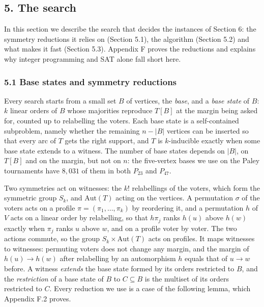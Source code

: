 \documentclass[
]{article}
\begin{document}
\subsection{5. The search}\label{the-search}

In this section we describe the search that decides the instances of
Section 6: the symmetry reductions it relies on (Section 5.1), the
algorithm (Section 5.2) and what makes it fast (Section 5.3). Appendix F
proves the reductions and explains why integer programming and SAT alone
fall short here.

\subsubsection{5.1 Base states and symmetry
reductions}\label{base-states-and-symmetry-reductions}

Every search starts from a small set \(B\) of vertices, the \emph{base},
and a \emph{base state} of \(B\): \(k\) linear orders of \(B\) whose
majorities reproduce \(T[B]\) at the margin being asked for, counted up
to relabelling the voters. Each base state is a self-contained
subproblem, namely whether the remaining \(n - |B|\) vertices can be
inserted so that every arc of \(T\) gets the right support, and \(T\) is
\(k\)-inducible exactly when some base state extends to a witness. The
number of base states depends on \(|B|\), on \(T[B]\) and on the margin,
but not on \(n\): the five-vertex bases we use on the Paley tournaments
have \(8{,}031\) of them in both \(P_{23}\) and \(P_{47}\).

Two symmetries act on witnesses: the \(k!\) relabellings of the voters,
which form the symmetric group \(S_k\), and \(\mathrm{Aut}(T)\) acting
on the vertices. A permutation \(\sigma\) of the voters acts on a
profile \(\pi = (\pi_1, \dots, \pi_k)\) by reordering it, and a
permutation \(h\) of \(V\) acts on a linear order by relabelling, so
that \(h\pi_j\) ranks \(h(u)\) above \(h(w)\) exactly when \(\pi_j\)
ranks \(u\) above \(w\), and on a profile voter by voter. The two
actions commute, so the group \(S_k \times \mathrm{Aut}(T)\) acts on
profiles. It maps witnesses to witnesses: permuting voters does not
change any margin, and the margin of \(h(u) \to h(w)\) after relabelling
by an automorphism \(h\) equals that of \(u \to w\) before. A witness
\emph{extends} the base state formed by its orders restricted to \(B\),
and the \emph{restriction} of a base state of \(B\) to \(C \subseteq B\)
is the multiset of its orders restricted to \(C\). Every reduction we
use is a case of the following lemma, which Appendix F.2 proves.
\end{document}
